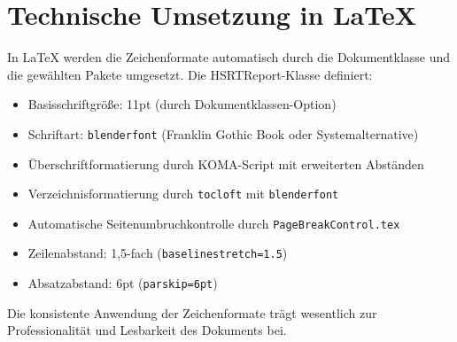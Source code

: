 \section{Technische Umsetzung in \LaTeX}
\label{sec:technische_umsetzung}

In \LaTeX{} werden die Zeichenformate automatisch durch die Dokumentklasse und die gewählten Pakete umgesetzt. Die HSRTReport-Klasse definiert:
\begin{itemize}
	\item Basisschriftgröße: 11pt (durch Dokumentklassen-Option)
	\item Schriftart: \texttt{blenderfont} (Franklin Gothic Book oder Systemalternative)
	\item Überschriftformatierung durch KOMA-Script mit erweiterten Abständen
	\item Verzeichnisformatierung durch \texttt{tocloft} mit \texttt{blenderfont}
	\item Automatische Seitenumbruchkontrolle durch \texttt{PageBreakControl.tex}
	\item Zeilenabstand: 1,5-fach (\texttt{baselinestretch=1.5})
	\item Absatzabstand: 6pt (\texttt{parskip=6pt})
\end{itemize}

Die konsistente Anwendung der Zeichenformate trägt wesentlich zur Professionalität und Lesbarkeit des Dokuments bei.

